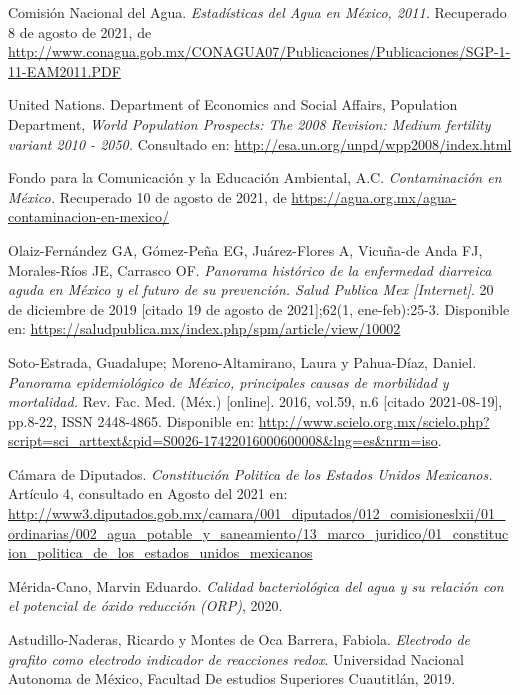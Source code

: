 \begin{thebibliography}{99}

    Comisión Nacional del Agua.
    \textit{Estadísticas del Agua en México, 2011.} Recuperado 8 de agosto de 2021, de \url{http://www.conagua.gob.mx/CONAGUA07/Publicaciones/Publicaciones/SGP-1-11-EAM2011.PDF}
    
    United Nations. Department of Economics and Social Affairs, Population Department,
    \textit{World Population Prospects: The 2008 Revision: Medium fertility variant 2010 - 2050.}
    Consultado en: \url{http://esa.un.org/unpd/wpp2008/index.html} 
    
    Fondo para la Comunicación y la Educación Ambiental, A.C.
    \textit{Contaminación en México.} Recuperado 10 de agosto de 2021, de \url{https://agua.org.mx/agua-contaminacion-en-mexico/}
    
    Olaiz-Fernández GA, Gómez-Peña EG, Juárez-Flores A, Vicuña-de Anda FJ, Morales-Ríos JE, Carrasco OF. \textit{Panorama histórico de la enfermedad diarreica aguda en México y el futuro de su prevención. Salud Publica Mex [Internet]}. 20 de diciembre de 2019 [citado 19 de agosto de 2021];62(1, ene-feb):25-3. Disponible en: \url{https://saludpublica.mx/index.php/spm/article/view/10002}
    
    Soto-Estrada, Guadalupe; Moreno-Altamirano, Laura  y  Pahua-D\'iaz, Daniel. \textit{Panorama epidemiológico de México, principales causas de morbilidad y mortalidad.} Rev. Fac. Med. (Méx.) [online]. 2016, vol.59, n.6 [citado  2021-08-19], pp.8-22, ISSN 2448-4865. Disponible en: \url{http://www.scielo.org.mx/scielo.php?script=sci_arttext&pid=S0026-17422016000600008&lng=es&nrm=iso}. 
    
    Cámara de Diputados. \textit{Constitución Politica de los Estados Unidos Mexicanos.} Artículo 4, consultado en Agosto del 2021 en:  
    \url{http://www3.diputados.gob.mx/camara/001_diputados/012_comisioneslxii/01_ordinarias/002_agua_potable_y_saneamiento/13_marco_juridico/01_constitucion_politica_de_los_estados_unidos_mexicanos}
    
    Mérida-Cano, Marvin Eduardo.
    \textit{Calidad bacteriológica del agua y su relación con el potencial de óxido reducción (ORP)}, 2020.
    
    Astudillo-Naderas, Ricardo y Montes de Oca Barrera, Fabiola. \textit{Electrodo de grafito como electrodo indicador de reacciones redox}.  Universidad Nacional Autonoma de México, Facultad De estudios Superiores Cuautitlán, 2019.
    

\end{thebibliography}
